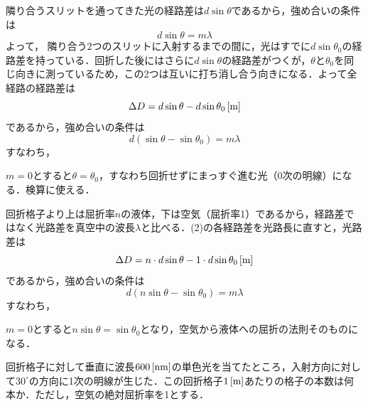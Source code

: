 \begin{reidaiunit}
\begin{kaitou}
\begin{komon}
 隣り合うスリットを通ってきた光の経路差は$d\sin\theta$であるから，強め合いの条件は
       \[d\sin\theta=m\lambda\]
       よって，
 隣り合う2つのスリットに入射するまでの間に，光はすでに$d\sin\theta_0$の経路差を持っている．回折した後にはさらに$d\sin\theta$の経路差がつくが，$\theta$と$\theta_0$を同じ向きに測っているため，この2つは互いに打ち消し合う向きになる．よって全経路の経路差は
       \[\Delta D=d\sin\theta-d\sin\theta_0\,[\mathrm{m}]\]
       であるから，強め合いの条件は
       \[d(\sin\theta-\sin\theta_0)=m\lambda\]
       すなわち，
       \begin{chuu}
       $m=0$とすると$\theta=\theta_0$，すなわち回折せずにまっすぐ進む光（0次の明線）になる．検算に使える．
       \end{chuu}
 回折格子より上は屈折率$n$の液体，下は空気（屈折率1）であるから，経路差ではなく光路差を真空中の波長$\lambda$と比べる．(2)の各経路差を光路長に直すと，光路差は
       \[\Delta D=n\cdot d\sin\theta-1\cdot d\sin\theta_0\,[\mathrm{m}]\]
       であるから，強め合いの条件は
       \[d(n\sin\theta-\sin\theta_0)=m\lambda\]
       すなわち，
       \begin{chuu}
       $m=0$とすると$n\sin\theta=\sin\theta_0$となり，空気から液体への屈折の法則そのものになる．
       \end{chuu}
\end{komon}
\end{kaitou}
\end{reidaiunit}


\newpage

\setcounter{qno}{49}

\filbreak
{}


\hspace{1zw}回折格子に対して垂直に波長$600\,[\mathrm{nm}]$の単色光を当てたところ，入射方向に対して$30^\circ$の方向に1次の明線が生じた．この回折格子$1\,[\mathrm{m}]$あたりの格子の本数は何本か．ただし，空気の絶対屈折率を1とする．

